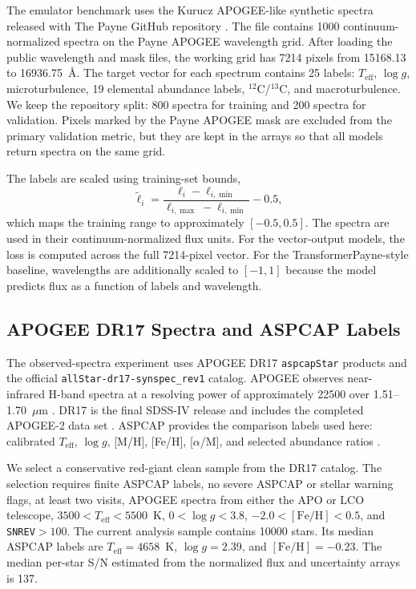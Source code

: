 \documentclass[universe,article,submit,pdftex,moreauthors]{Definitions/mdpi}
\begin{document}
The emulator benchmark uses the Kurucz APOGEE-like synthetic spectra released
with The Payne GitHub repository \cite{ting2019payne}. The file contains 1000
continuum-normalized spectra on the Payne APOGEE wavelength grid. After loading
the public wavelength and mask files, the working grid has 7214 pixels from
15168.13 to 16936.75~\AA. The target vector for each spectrum contains 25
labels: $T_{\mathrm{eff}}$, $\log g$, microturbulence, 19 elemental abundance
labels, $^{12}$C/$^{13}$C, and macroturbulence. We keep the repository split:
800 spectra for training and 200 spectra for validation. Pixels marked by the
Payne APOGEE mask are excluded from the primary validation metric, but they are
kept in the arrays so that all models return spectra on the same grid.

The labels are scaled using training-set bounds,
\begin{equation}
    \label{eq:label-scaling}
    \tilde{\ell}_i =
    \frac{\ell_i - \ell_{i,\min}}{\ell_{i,\max}-\ell_{i,\min}} - 0.5,
\end{equation}
which maps the training range to approximately $[-0.5,0.5]$. The spectra are
used in their continuum-normalized flux units. For the vector-output models,
the loss is computed across the full 7214-pixel vector. For the
TransformerPayne-style baseline, wavelengths are additionally scaled to
$[-1,1]$ because the model predicts flux as a function of labels and
wavelength.

\subsection{APOGEE DR17 Spectra and ASPCAP Labels}

The observed-spectra experiment uses APOGEE DR17 \texttt{aspcapStar} products
and the official \texttt{allStar-dr17-synspec\_rev1} catalog. APOGEE observes
near-infrared H-band spectra at a resolving power of approximately 22500 over
1.51--1.70~$\mu$m \cite{majewski2017apogee,wilson2019apogee}. DR17 is the final
SDSS-IV release and includes the completed APOGEE-2 data set
\cite{abdurrouf2022sdssdr17}. ASPCAP provides the comparison labels used here:
calibrated $T_{\mathrm{eff}}$, $\log g$, [M/H], [Fe/H], [$\alpha$/M], and
selected abundance ratios \cite{garciaperez2016aspcap,jonsson2020apogeedr16}.

We select a conservative red-giant clean sample from the DR17 catalog. The
selection requires finite ASPCAP labels, no severe ASPCAP or stellar warning
flags, at least two visits, APOGEE spectra from either the APO or LCO
telescope, $3500<T_{\mathrm{eff}}<5500$~K, $0<\log g<3.8$,
$-2.0<\mathrm{[Fe/H]}<0.5$, and \texttt{SNREV}$>100$. The current analysis
sample contains 10000 stars. Its median ASPCAP labels are
$T_{\mathrm{eff}}=4658$~K, $\log g=2.39$, and $\mathrm{[Fe/H]}=-0.23$. The
median per-star S/N estimated from the normalized flux and uncertainty arrays
is 137.
\end{document}
